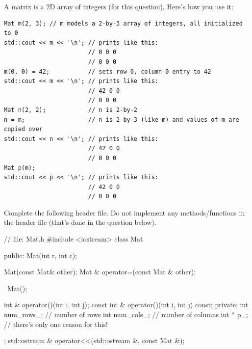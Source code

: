 

\nextq
A matrix is a 2D array of integers (for this question).
Here's how you use it:
\begin{Verbatim}[frame=single,fontsize=\footnotesize]
Mat m(2, 3); // m models a 2-by-3 array of integers, all initialized to 0
std::cout << m << '\n'; // prints like this:
                        // 0 0 0
                        // 0 0 0
m(0, 0) = 42;           // sets row 0, column 0 entry to 42
std::cout << m << '\n'; // prints like this:
                        // 42 0 0
                        // 0 0 0
Mat n(2, 2);            // n is 2-by-2
n = m;                  // n is 2-by-3 (like m) and values of m are copied over
std::cout << n << '\n'; // prints like this:
                        // 42 0 0
                        // 0 0 0
Mat p(m);
std::cout << p << '\n'; // prints like this:
                        // 42 0 0
                        // 0 0 0
\end{Verbatim}
Complete the following header file.
Do not implement any methods/functions in the header file
(that's done in the question below).
\\
\ANSWER
\begin{answercode}
// file: Mat.h
#include <iostream>
class Mat
{
public:
Mat(int r, int c);

Mat(const Mat& other);
Mat & operator=(const Mat & other);

~Mat();

int & operator()(int i, int j);
const int & operator()(int i, int j) const;
private:
    int num_rows_; // number of rows
    int num_cols_; // number of columns
    int * p_;      // there's only one reason for this!
};
std::ostream & operator<<(std::ostream &, const Mat &);
\end{answercode}

